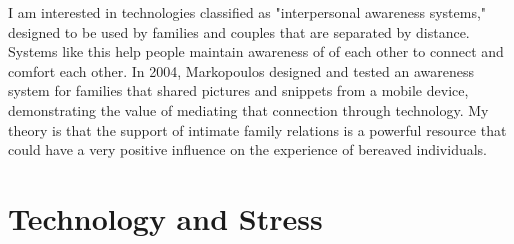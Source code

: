  I am interested in technologies classified as "interpersonal awareness systems,"
  designed to be used by families and couples that are separated by distance.
  Systems like this help people maintain awareness of  of each other to connect
  and comfort each other. \cite{neustaedter06}
  In 2004, Markopoulos designed and tested an
  awareness system for families that shared pictures and snippets from a mobile
  device, demonstrating the value of mediating that connection through technology.
  \cite{markopoulos04}
  My theory is that the support of intimate family relations is a powerful
  resource that could
  have a very positive influence on the experience of bereaved individuals.


\section{Technology and Stress}





